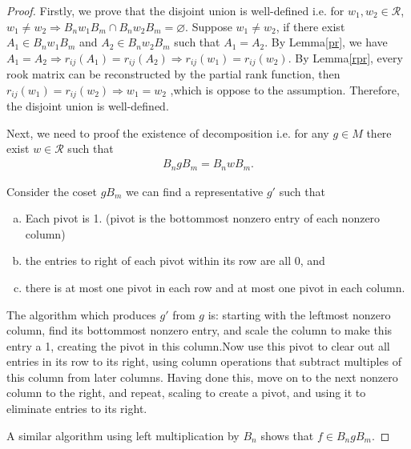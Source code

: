 \documentclass[10pt,UTF8]{article}
\theoremstyle{definition}
\renewcommand{\qed}{\rightline{$\qedsymbol$}}
\renewcommand{\emptyset}{\varnothing}
\newtheorem*{proof}{Proof}
\begin{document}
  
  \begin{proof}
    Firstly, we prove that the disjoint union is well-defined i.e. for $w_1,w_2\in \mathcal{R}$, $w_1\neq w_2\Rightarrow B_nw_1B_m \cap B_nw_2B_m = \emptyset$. 
    Suppose $w_1\neq w_2$, if there exist $A_1\in B_nw_1B_m$ and $A_2\in B_nw_2B_m$ such that $A_1=A_2$.
    By Lemma\ref{pr}, we have $A_1 = A_2 \Rightarrow r_{ij}(A_1)=r_{ij}(A_2) \Rightarrow r_{ij}(w_1)= r_{ij}(w_2)$.
    By Lemma\ref{rpr}, every rook matrix can be reconstructed by the partial rank function, then $r_{ij}(w_1)= r_{ij}(w_2)\Rightarrow w_1 = w_2$
    ,which is oppose to the assumption.
    Therefore, the disjoint union is well-defined. 

    Next, we need to proof the existence of decomposition i.e. for any $g\in M$ there exist $w\in \mathcal{R}$ such that
    \begin{align*}
      B_ngB_m = B_nwB_m.
    \end{align*}

    Consider the coset $gB_m$ we can find a representative $g'$ such that 
    \begin{enumerate}[a)]
      \item Each pivot is 1. (pivot is the bottommost nonzero entry of each nonzero column) 
      \item the entries to right of each pivot within its row are all 0, and
      \item there is at most one pivot in each row and at most one pivot in each column. 
    \end{enumerate}
    The algorithm which produces $g'$ from $g$ is: starting with the leftmost nonzero column, find its bottommost nonzero entry, and scale the column
    to make this entry a 1, creating the pivot in this column.Now use this pivot to clear out all entries in its
    row to its right, using column operations that subtract multiples of this column from later columns. Having
    done this, move on to the next nonzero column to the right, and repeat, scaling to create a pivot, and using
    it to eliminate entries to its right.

    A similar algorithm using left multiplication by $B_n$ shows that $f\in B_ngB_m$.

    \qed



  \end{proof}



\newpage
\end{document}
